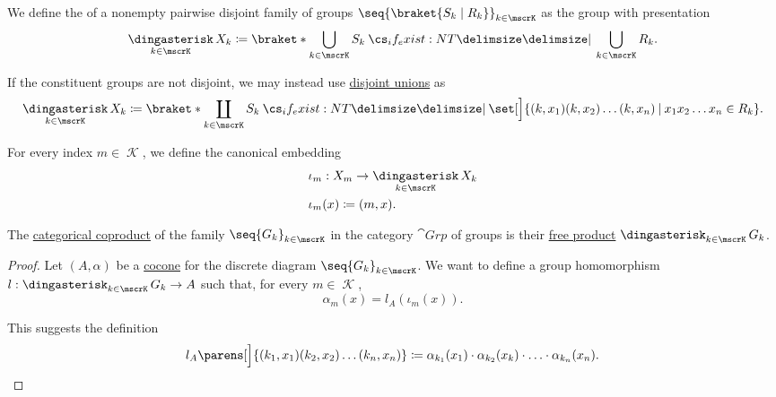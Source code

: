 \begin{definition}\label{def:group_free_product}
  We define the  of a nonempty pairwise disjoint family of groups \( \seq{ \braket{S_k \mid R_k} }_{k \in \mscrK} \) as the group with presentation
  \begin{equation*}
    \Ast_{k \in \mscrK} X_k \coloneqq \braket*{ \bigcup_{k \in \mscrK} S_k \given* \bigcup_{k \in \mscrK} R_k }.
  \end{equation*}

  If the constituent groups are not disjoint, we may instead use \hyperref[def:disjoint_union]{disjoint unions} as
  \small
  \begin{equation*}
    \Ast_{k \in \mscrK} X_k \coloneqq \braket*{ \coprod_{k \in \mscrK} S_k \given* \set[\Big]{ (k, x_1) (k, x_2) \ldots (k, x_n) \given x_1 x_2 \ldots x_n \in R_k } }.
  \end{equation*}
  \normalsize

  For every index \( m \in \mscrK \), we define the canonical embedding
  \begin{equation*}
    \begin{aligned}
       &\iota_m: X_m \to \Ast_{k \in \mscrK} X_k \\
       &\iota_m(x) \coloneqq (m, x).
    \end{aligned}
  \end{equation*}
\end{definition}

\begin{proposition}\label{thm:group_coproduct}
  The \hyperref[def:discrete_category_limits]{categorical coproduct} of the family \( \seq{ G_k }_{k \in \mscrK} \) in the category \hyperref[def:group/category]{\( \cat{Grp} \)} of groups is their \hyperref[def:group_free_product]{free product} \( \Ast_{k \in \mscrK} G_k \).
\end{proposition}
\begin{proof}
  Let \( (A, \alpha) \) be a \hyperref[def:category_of_cones/cocone]{cocone} for the discrete diagram \( \seq{ G_k }_{k \in \mscrK} \). We want to define a group homomorphism \( l: \Ast_{k \in \mscrK} G_k \to A \) such that, for every \( m \in \mscrK \),
  \begin{equation*}
    \alpha_m(x) = l_A(\iota_m(x)).
  \end{equation*}

  This suggests the definition
  \begin{equation*}
    l_A\parens[\Big]{ (k_1, x_1) (k_2, x_2) \ldots (k_n, x_n) } \coloneqq \alpha_{k_1}(x_1) \cdot \alpha_{k_2}(x_k) \cdot \ldots \cdot \alpha_{k_n}(x_n).
  \end{equation*}
\end{proof}


